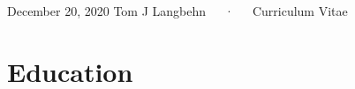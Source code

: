 \documentclass[11pt, a4paper]{awesome-cv}
\begin{document}
\makecvheader

\makecvfooter
  {December 20, 2020}
    {Tom J Langbehn~~~·~~~Curriculum Vitae}
  {\thepage}





\hypertarget{education}{%
\section{Education}\label{education}}
\end{document}
